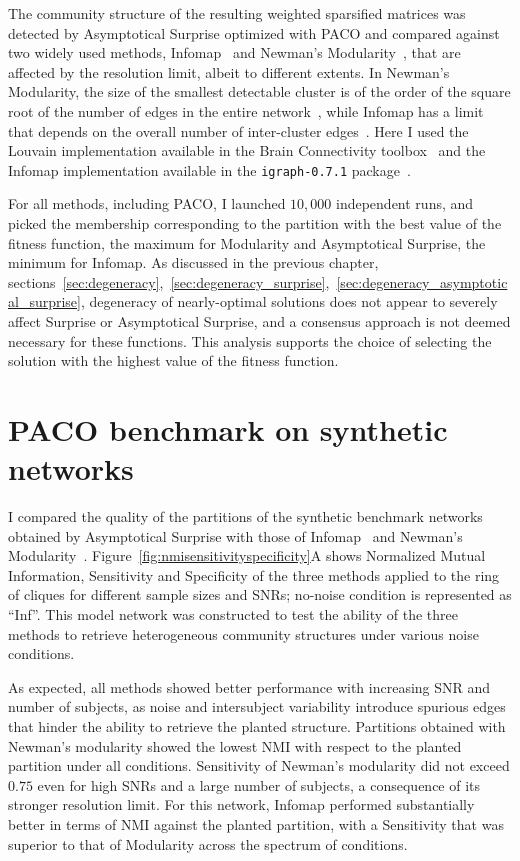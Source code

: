 The community structure of the resulting weighted sparsified matrices was detected by Asymptotical Surprise optimized with PACO and compared against two widely used methods, Infomap~\cite{rosvall2008} and Newman's Modularity~\cite{blondel2008,newman2006}, that are affected by the resolution limit, albeit to different extents.
In Newman's Modularity, the size of the smallest detectable cluster is of the order of the square root of the number of edges in the entire network~\cite{fortunato2007}, while Infomap has a limit that depends on the overall number of inter-cluster edges~\cite{kawamoto2015}.
Here I used the Louvain implementation available in the Brain Connectivity toolbox~\cite{rubinov2010} and the Infomap implementation available in the \texttt{igraph-0.7.1} package~\cite{igraph2006}.

For all methods, including PACO, I launched $10,000$ independent runs, and picked the membership corresponding to the partition with the best value of the fitness function, the maximum for Modularity and Asymptotical Surprise, the minimum for Infomap.
As discussed in the previous chapter, sections~\ref{sec:degeneracy},~\ref{sec:degeneracy_surprise},~\ref{sec:degeneracy_asymptotical_surprise}, degeneracy of nearly-optimal solutions does not appear to severely affect Surprise or Asymptotical Surprise, and a consensus approach is not deemed necessary for these functions.
This analysis supports the choice of selecting the solution with the highest value of the fitness function.

\section{PACO benchmark on synthetic networks}
I compared the quality of the partitions of the synthetic benchmark networks obtained by Asymptotical Surprise with those of Infomap~\cite{rosvall2008} and Newman's Modularity~\cite{newman2006,blondel2008}.
Figure~\ref{fig:nmisensitivityspecificity}A shows Normalized Mutual Information, Sensitivity and Specificity of the three methods applied to the ring of cliques for different sample sizes and SNRs; no-noise condition is represented as ``Inf''.
This model network was constructed to test the ability of the three methods to retrieve heterogeneous community structures under various noise conditions.

As expected, all methods showed better performance with increasing SNR and number of subjects, as noise and intersubject variability introduce spurious edges that hinder the ability to retrieve the planted structure.
Partitions obtained with Newman's modularity showed the lowest NMI with respect to the planted partition under all conditions.
Sensitivity of Newman's modularity did not exceed $0.75$ even for high SNRs and a large number of subjects, a consequence of its stronger resolution limit.
For this network, Infomap performed substantially better in terms of NMI against the planted partition, with a Sensitivity that was superior to that of Modularity across the spectrum of conditions.

